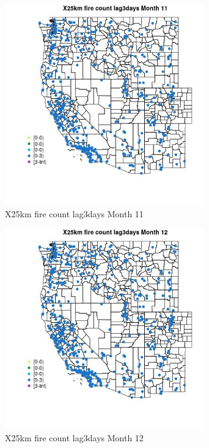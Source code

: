 \begin{figure} 
\centering  
\includegraphics[width=0.77\textwidth]{Code_Outputs/Report_ML_input_PM25_Step4_part_e_de_duplicated_aves_compiled_2019-05-14wNAs_MapObsMo11X25km_fire_count_lag3days.jpg} 
\caption{\label{fig:Report_ML_input_PM25_Step4_part_e_de_duplicated_aves_compiled_2019-05-14wNAsMapObsMo11X25km_fire_count_lag3days}X25km fire count lag3days Month 11} 
\end{figure} 
 

\clearpage 

\begin{figure} 
\centering  
\includegraphics[width=0.77\textwidth]{Code_Outputs/Report_ML_input_PM25_Step4_part_e_de_duplicated_aves_compiled_2019-05-14wNAs_MapObsMo12X25km_fire_count_lag3days.jpg} 
\caption{\label{fig:Report_ML_input_PM25_Step4_part_e_de_duplicated_aves_compiled_2019-05-14wNAsMapObsMo12X25km_fire_count_lag3days}X25km fire count lag3days Month 12} 
\end{figure} 
 

